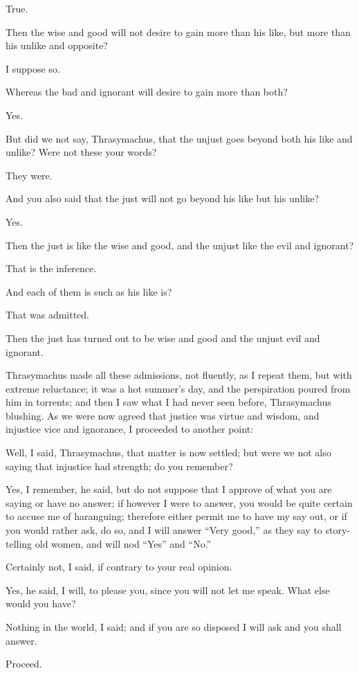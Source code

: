 True.

Then the wise and good will not desire to gain more than his like, but
more than his unlike and opposite?

I suppose so.

Whereas the bad and ignorant will desire to gain more than both?

Yes.

But did we not say, Thrasymachus, that the unjust goes beyond both his
like and unlike? Were not these your words?

They were.

And you also said that the just will not go beyond his like but his
unlike?

Yes.

Then the just is like the wise and good, and the unjust like the evil
and ignorant?

That is the inference.

And each of them is such as his like is?

That was admitted.

Then the just has turned out to be wise and good and the unjust evil and
ignorant.

Thrasymachus made all these admissions, not fluently, as I repeat
them, but with extreme reluctance; it was a hot summer's day, and the
perspiration poured from him in torrents; and then I saw what I had
never seen before, Thrasymachus blushing. As we were now agreed that
justice was virtue and wisdom, and injustice vice and ignorance, I
proceeded to another point:

Well, I said, Thrasymachus, that matter is now settled; but were we not
also saying that injustice had strength; do you remember?

Yes, I remember, he said, but do not suppose that I approve of what you
are saying or have no answer; if however I were to answer, you would be
quite certain to accuse me of haranguing; therefore either permit me to
have my say out, or if you would rather ask, do so, and I will answer
``Very good,'' as they say to story-telling old women, and will nod ``Yes''
and ``No.''

Certainly not, I said, if contrary to your real opinion.

Yes, he said, I will, to please you, since you will not let me speak.
What else would you have?

Nothing in the world, I said; and if you are so disposed I will ask and
you shall answer.

Proceed.

